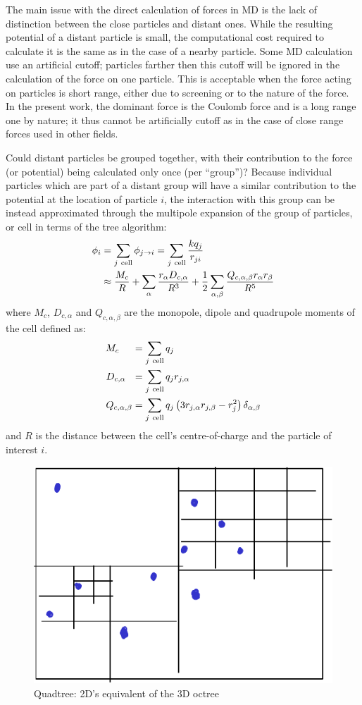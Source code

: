 The main issue with the direct calculation of forces in MD is the lack of
distinction between the close particles and distant ones. While the resulting
potential of a distant particle is small, the computational cost required to
calculate it is the same as in the case of a nearby particle. Some MD
calculation use an artificial cutoff; particles farther then this cutoff will
be ignored in the calculation of the force on one particle. This is acceptable
when the force acting on particles is short range, either due to screening or
to the nature of the force. In the present work, the dominant force is the
Coulomb force and is a long range one by nature; it thus cannot be artificially
cutoff as in the case of close range forces used in other fields.

Could distant particles be grouped together, with their contribution to the
force (or potential) being calculated only once (per ``group'')? Because
individual particles which are part of a distant group will have a similar
contribution to the potential at the location of particle $i$, the interaction
with this group can be instead approximated through the multipole
expansion\cite{Gibbon2002} of the group of particles, or cell in terms of the
tree algorithm:
\begin{align}
\phi_i & = \sum_{j~\textrm{cell}} \phi_{j \rightarrow i} = \sum_{j~{\rm cell}}
\frac{k q_j}{r_{ji}} \\
& \approx \frac{M_{c}}{R}
+ \sum_{\alpha} \frac{r_{\alpha} D_{c,\alpha}}{R^3}
+ \frac{1}{2} \sum_{\alpha,\beta} \frac{
        Q_{c,\alpha,\beta} r_{\alpha} r_{\beta}
    }{R^5}
\end{align}
where $M_{c}$, $D_{c,\alpha}$ and $Q_{c,\alpha,\beta}$ are the monopole, dipole
and quadrupole moments of the cell defined as:
\begin{subequations}
\begin{align}
M_{c}           ~~~~& = \sum_{j~\textrm{cell}} q_{j} \\
D_{c,\alpha}      ~~& = \sum_{j~\textrm{cell}} q_{j} r_{j,\alpha} \\
Q_{c,\alpha,\beta}  & = \sum_{j~\textrm{cell}} q_{j} \left( 3 r_{j,\alpha}
r_{j,\beta} - r_{j}^2 \right) \delta_{\alpha,\beta}
\end{align}
\label{eqn:tree:moments}
\end{subequations}
and $R$ is the distance between the cell's centre-of-charge and the
particle of interest $i$.

\begin{figure}
 \centering
 \includegraphics[width=0.38\columnwidth]{figures/mockups/quadtree}
 \caption{Quadtree: 2D's equivalent of the 3D octree}
 \label{fig:tree:quadtree}
\end{figure}

